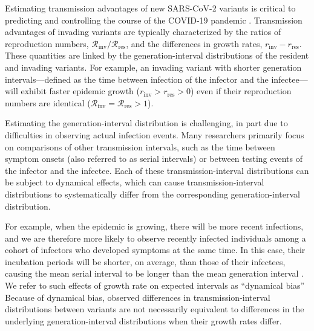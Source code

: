 \documentclass[12pt]{article}
\newcommand{\Rx}[1]{\ensuremath{{\mathcal R}_{#1}}\xspace}
\newcommand{\Rres}{\Rx{\mathrm{res}}}
\newcommand{\Rinv}{\Rx{\mathrm{inv}}}
\newcommand{\rx}[1]{\ensuremath{{r}_{#1}}\xspace}
\newcommand{\rres}{\rx{\mathrm{res}}}
\newcommand{\rinv}{\rx{\mathrm{inv}}}
\begin{document}
Estimating transmission advantages of new SARS-CoV-2 variants is critical to predicting and controlling the course of the COVID-19 pandemic \citep{park2021roles}.
Transmission advantages of invading variants are typically characterized by the ratios of reproduction numbers, $\Rinv/\Rres$, and the differences in growth rates, $\rinv-\rres$.
These quantities are linked by the generation-interval distributions of the resident and invading variants.
For example, an invading variant with shorter generation intervals---defined as the time between infection of the infector and the infectee---will exhibit faster epidemic growth ($\rinv > \rres > 0$) even if their reproduction numbers are identical ($\Rinv = \Rres > 1$).

Estimating the generation-interval distribution is challenging, in part due to difficulties in observing actual infection events.
Many researchers primarily focus on comparisons of other transmission intervals, such as the time between symptom onsets (also referred to as serial intervals) or between testing events \citep{abbott2022test} of the infector and the infectee.
Each of these transmission-interval distributions can be subject to dynamical effects, which can cause transmission-interval distributions to systematically differ from the corresponding generation-interval distribution.

For example, when the epidemic is growing, there will be more recent infections, and we are therefore more likely to observe recently infected individuals among a cohort of infectors who developed symptoms at the same time.
In this case, their incubation periods will be shorter, on average, than those of their infectees, causing the mean serial interval to be longer than the mean generation interval \citep{park2021forward}.
We refer to such effects of growth rate on expected intervals as ``dynamical bias''
Because of dynamical bias, observed differences in transmission-interval distributions between variants are not necessarily equivalent to differences in the underlying generation-interval distributions when their growth rates differ.
\end{document}
